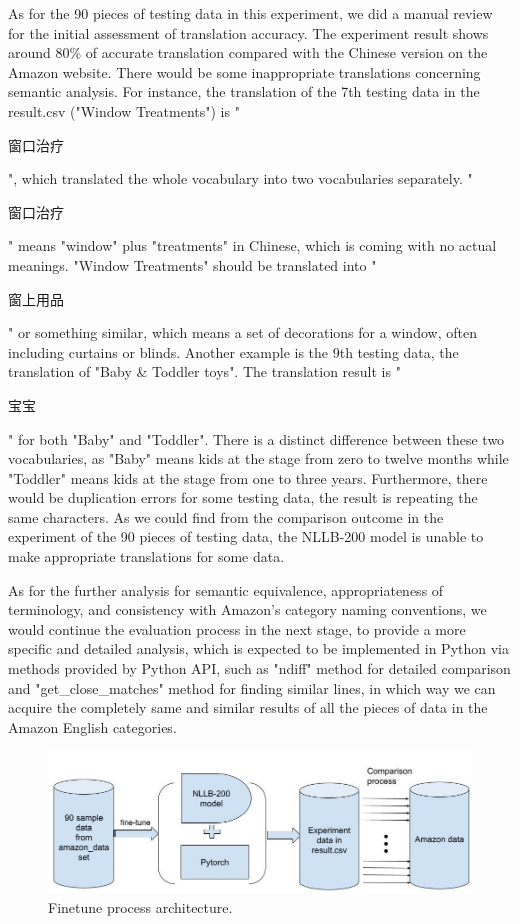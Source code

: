 \documentclass[sigconf]{acmart}
\begin{document}
As for the 90 pieces of testing data in this experiment, we did a manual review for the initial assessment of translation accuracy. The experiment result shows around 80\% of accurate translation compared with the Chinese version on the Amazon website. There would be some inappropriate translations concerning semantic analysis.\cite{palmer_wu_1995} For instance, the translation of the 7th testing data in the result.csv ("Window Treatments") is "\begin{CJK*}{UTF8}{gbsn}窗口治疗\end{CJK*}", which translated the whole vocabulary into two vocabularies separately. "\begin{CJK*}{UTF8}{gbsn}窗口治疗\end{CJK*}" means "window" plus "treatments" in Chinese, which is coming with no actual meanings. "Window Treatments" should be translated into "\begin{CJK*}{UTF8}{gbsn}窗上用品\end{CJK*}" or something similar, which means a set of decorations for a window, often including curtains or blinds.\cite{window_treatment_definition_meaning_yourdictionary} Another example is the 9th testing data, the translation of "Baby \& Toddler toys". The translation result is "\begin{CJK*}{UTF8}{gbsn}宝宝\end{CJK*}" for both "Baby" and "Toddler". There is a distinct difference between these two vocabularies, as "Baby" means kids at the stage from zero to twelve months while "Toddler" means kids at the stage from one to three years.\cite{american_academy_of_pediatrics_2019} Furthermore, there would be duplication errors for some testing data, the result is repeating the same characters.\cite{koponen_2010} As we could find from the comparison outcome in the experiment of the 90 pieces of testing data, the NLLB-200 model is unable to make appropriate translations for some data. 

As for the further analysis for semantic equivalence, appropriateness of terminology, and consistency with Amazon's category naming conventions, we would continue the evaluation process in the next stage, to provide a more specific and detailed analysis, which is expected to be implemented in Python via methods provided by Python API, such as "ndiff" method for detailed comparison and "get\_close\_matches" method for finding similar lines, \cite{difflib_helpers_for_computing-deltas_python_documentation}in which way we can acquire the completely same and similar results of all the pieces of data in the Amazon English categories.

\begin{figure}[t]
    \centering
    \includegraphics[width=1.1\linewidth, natwidth=610,natheight=642]{illustrate_figure.jpeg}
    \caption{Finetune process architecture.}
    
\end{figure}


 
\end{document}
